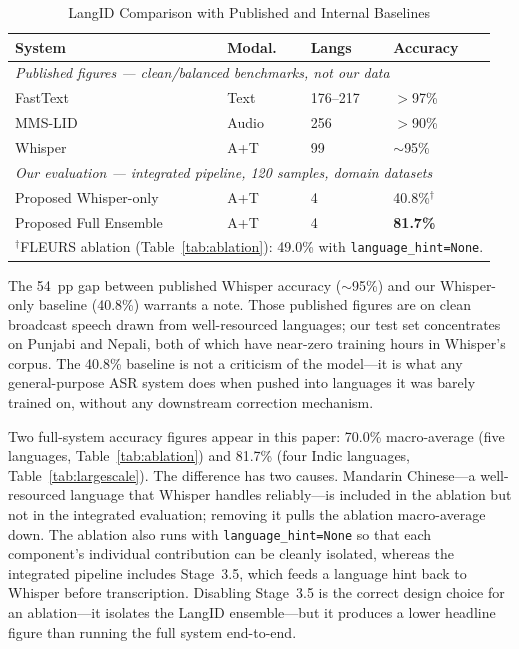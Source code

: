 \documentclass[12pt, onecolumn]{IEEEtran}
\begin{document}
\begin{table}[htbp]
\caption{LangID Comparison with Published and Internal Baselines}
\label{tab:baselines}
\begin{center}
\begin{tabular}{llll}
\toprule
\textbf{System} & \textbf{Modal.} & \textbf{Langs} & \textbf{Accuracy} \\
\midrule
\multicolumn{4}{p{8cm}}{\footnotesize\textit{Published figures --- clean/balanced benchmarks, not our data}} \\
FastText~\cite{joulin2017bag,costajussa2024nllb} & Text & 176--217 & $>$97\% \\
MMS-LID~\cite{pratap2023scaling} & Audio & 256 & $>$90\% \\
Whisper~\cite{radford2022whisper} & A+T & 99 & $\sim$95\% \\
\midrule
\multicolumn{4}{p{8cm}}{\footnotesize\textit{Our evaluation --- integrated pipeline, 120 samples, domain datasets}} \\
Proposed Whisper-only & A+T & 4 & 40.8\%$^\dagger$ \\
Proposed Full Ensemble & A+T & 4 & \textbf{81.7\%} \\
\multicolumn{4}{p{7.5cm}}{\footnotesize $^\dagger$FLEURS ablation (Table~\ref{tab:ablation}): 49.0\% with \texttt{language\_hint=None}.} \\
\bottomrule
\end{tabular}
\end{center}
\end{table}

The 54~pp gap between published Whisper accuracy ($\sim$95\%) and our Whisper-only baseline (40.8\%) warrants a note. Those published figures are on clean broadcast speech drawn from well-resourced languages; our test set concentrates on Punjabi and Nepali, both of which have near-zero training hours in Whisper's corpus. The 40.8\% baseline is not a criticism of the model---it is what any general-purpose ASR system does when pushed into languages it was barely trained on, without any downstream correction mechanism.

Two full-system accuracy figures appear in this paper: 70.0\% macro-average (five languages, Table~\ref{tab:ablation}) and 81.7\% (four Indic languages, Table~\ref{tab:largescale}). The difference has two causes. Mandarin Chinese---a well-resourced language that Whisper handles reliably---is included in the ablation but not in the integrated evaluation; removing it pulls the ablation macro-average down. The ablation also runs with \texttt{language\_hint=None} so that each component's individual contribution can be cleanly isolated, whereas the integrated pipeline includes Stage~3.5, which feeds a language hint back to Whisper before transcription. Disabling Stage~3.5 is the correct design choice for an ablation---it isolates the LangID ensemble---but it produces a lower headline figure than running the full system end-to-end.
\end{document}
